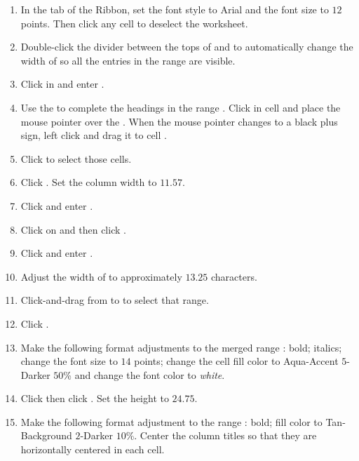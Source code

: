\begin{enumbox}
\begin{enumerate}
		\item In the  tab of the Ribbon, set the font style to Arial and the font size to $ 12 $ points. Then click any cell to deselect the worksheet.
		\item Double-click the divider between the tops of  and  to automatically change the width of  so all the entries in the range  are visible. 
		\item Click in  and enter .
		\item Use the  to complete the headings in the range . Click in cell  and place the mouse pointer over the . When the mouse pointer changes to a black plus sign, left click and drag it to cell .
		\item Click  to select those cells. 
		\item Click . Set the column width to $ 11.57 $.
		\item Click  and enter .
		\item Click on  and then click .
		\item Click  and enter .
		\item Adjust the width of  to approximately $ 13.25 $ characters.
		\item Click-and-drag from  to  to select that range. 
		\item Click .
		\item Make the following format adjustments to the merged range : bold; italics; change the font size to $ 14 $ points; change the cell fill color to Aqua-Accent $ 5 $-Darker $ 50 $\% and change the font color to \textit{white}.
		\item Click  then click . Set the height to $ 24.75 $.
		\item Make the following format adjustment to the range : bold; fill color to Tan-Background $ 2 $-Darker $ 10 $\%. Center the column titles so that they are horizontally centered in each cell.

\end{enumerate}
\end{enumbox}
